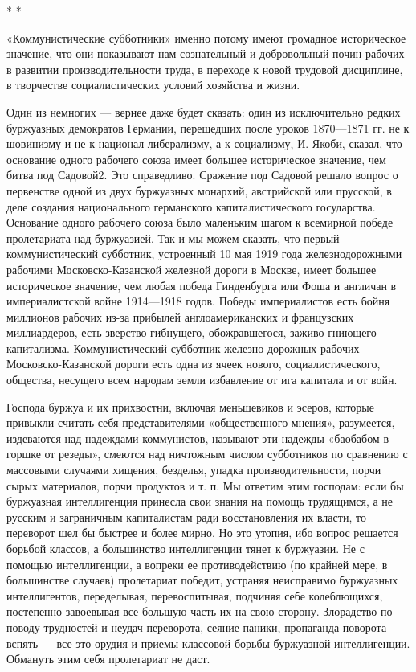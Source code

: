 \documentclass[12pt]{article}
\newcommand{\parnum}{(\arabic{parcount})}
\newcounter{parcount}
\newenvironment{parnumbers}{%
  \par%
  \everypar{\noindent \stepcounter{parcount}\marginpar[]{\parnum}}%
}{}
\begin{document}
\centering * * *

\begin{parnumbers}
  «Коммунистические субботники» именно потому имеют громадное историческое значение, что они показывают нам сознательный и добровольный почин рабочих в развитии производительности труда, в переходе к новой трудовой дисциплине, в творчестве социалистических условий хозяйства и жизни.

Один из немногих — вернее даже будет сказать: один из исключительно редких буржуазных демократов Германии, перешедших после уроков 1870—1871 гг. не к шовинизму и не к национал-либерализму, а к социализму, И. Якоби, сказал, что основание одного рабочего союза имеет большее историческое значение, чем битва под Садовой2. Это справедливо. Сражение под Садовой решало вопрос о первенстве одной из двух буржуазных монархий, австрийской или прусской, в деле создания национального германского капиталистического государства. Основание одного рабочего союза было маленьким шагом к всемирной победе пролетариата над буржуазией. Так и мы можем сказать, что первый коммунистический субботник, устроенный 10 мая 1919 года железнодорожными рабочими Московско-Казанской железной дороги в Москве, имеет большее историческое значение, чем любая победа Гинденбурга или Фоша и англичан в империалистской войне 1914—1918 годов. Победы империалистов есть бойня миллионов рабочих из-за прибылей англоамериканских и французских миллиардеров, есть зверство гибнущего, обожравшегося, заживо гниющего капитализма. Коммунистический субботник железно-дорожных рабочих Московско-Казанской дороги есть одна из ячеек нового, социалистического, общества, несущего всем народам земли избавление от ига капитала и от войн.

Господа буржуа и их прихвостни, включая меньшевиков и эсеров, которые привыкли считать себя представителями «общественного мнения», разумеется, издеваются над надеждами коммунистов, называют эти надежды «баобабом в горшке от резеды», смеются над ничтожным числом субботников по сравнению с массовыми случаями хищения, безделья, упадка производительности, порчи сырых материалов, порчи продуктов и т. п. Мы ответим этим господам: если бы буржуазная интеллигенция принесла свои знания на помощь трудящимся, а не русским и заграничным капиталистам ради восстановления их власти, то переворот шел бы быстрее и более мирно. Но это утопия, ибо вопрос решается борьбой классов, а большинство интеллигенции тянет к буржуазии. Не с помощью интеллигенции, а вопреки ее противодействию (по крайней мере, в большинстве случаев) пролетариат победит, устраняя неисправимо буржуазных интеллигентов, переделывая, перевоспитывая, подчиняя себе колеблющихся, постепенно завоевывая все большую часть их на свою сторону. Злорадство по поводу трудностей и неудач переворота, сеяние паники, пропаганда поворота вспять — все это орудия и приемы классовой борьбы буржуазной интеллигенции. Обмануть этим себя пролетариат не даст.


\end{parnumbers}
\end{document}

